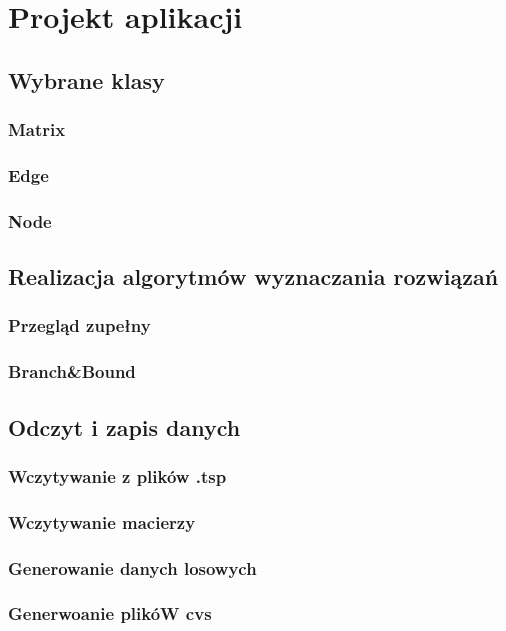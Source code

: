 \documentclass{article}
\begin{document}
\section{Projekt aplikacji}	
	\subsection{Wybrane klasy}
	
		\subsubsection{Matrix}
		\subsubsection{Edge}
		\subsubsection{Node}
		
	\subsection{Realizacja algorytmów wyznaczania rozwiązań}
		\subsubsection{Przegląd zupełny}
		\subsubsection{Branch\&Bound}
		
	\subsection{Odczyt i zapis danych}
		\subsubsection{Wczytywanie z plików .tsp}	
		\subsubsection{Wczytywanie macierzy}
		\subsubsection{Generowanie danych losowych}
		\subsubsection{Generwoanie plikóW cvs}
\end{document}
